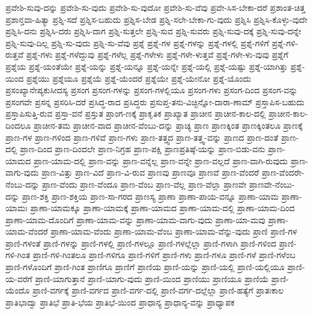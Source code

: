 {ಪ್ರವೇಶಿ-ಸುವು-ದನ್ನು
ಪ್ರವೇಶಿ-ಸು-ವುದು
ಪ್ರವೇಶಿ-ಸು-ವುದೋ
ಪ್ರವೇಶಿ-ಸು-ವೆವು
ಪ್ರವೇ-ಸಿಸ-ಬೇಕಾ-ದರೆ
ಪ್ರಶಾಂತ-ಚಿತ್ತ
ಪ್ರಶಾನ್ತವಾ-ಹಿತ್ಯಾ
ಪ್ರಶ್ನಿ-ಸದೆ
ಪ್ರಶ್ನಿಸ-ಬಹುದು
ಪ್ರಶ್ನಿಸ-ಬೇಡ
ಪ್ರಶ್ನಿ-ಸಲೇ-ಬೇಕಾ-ಗು-ವುದು
ಪ್ರಶ್ನಿಸಿ
ಪ್ರಶ್ನಿಸಿ-ಕೊಳ್ಳು-ವುದೇ
ಪ್ರಶ್ನಿಸಿ-ದನು
ಪ್ರಶ್ನಿಸಿ-ದರು
ಪ್ರಶ್ನಿಸಿ-ದಾಗ
ಪ್ರಶ್ನಿ-ಸುತ್ತಲೇ
ಪ್ರಶ್ನಿ-ಸುವ
ಪ್ರಶ್ನಿ-ಸುವರು
ಪ್ರಶ್ನಿ-ಸುವು-ದಕ್ಕೆ
ಪ್ರಶ್ನಿ-ಸುವು-ದನ್ನೇ
ಪ್ರಶ್ನಿ-ಸುವು-ದಿಲ್ಲ
ಪ್ರಶ್ನಿ-ಸು-ವುದು
ಪ್ರಶ್ನಿ-ಸು-ವೆವು
ಪ್ರಶ್ನೆ
ಪ್ರಶ್ನೆ-ಗಳ
ಪ್ರಶ್ನೆ-ಗಳನ್ನು
ಪ್ರಶ್ನೆ-ಗಳಲ್ಲಿ
ಪ್ರಶ್ನೆ-ಗಳಿಗೆ
ಪ್ರಶ್ನೆ-ಗಳಿ-ರುತ್ತವೆ
ಪ್ರಶ್ನೆ-ಗಳು
ಪ್ರಶ್ನೆ-ಗಳೆದ್ದುವು
ಪ್ರಶ್ನೆ-ಗಳೆಲ್ಲ
ಪ್ರಶ್ನೆ-ಗಳೇಳು
ಪ್ರಶ್ನೆ-ಗಳೇ-ಳುತ್ತವೆ
ಪ್ರಶ್ನೆ-ಗಳೇ-ಳು-ವುವು
ಪ್ರಶ್ನೆಗೆ
ಪ್ರಶ್ನೆಯ
ಪ್ರಶ್ನೆ-ಯಂತೆಯೇ
ಪ್ರಶ್ನೆ-ಯನ್ನು
ಪ್ರಶ್ನೆ-ಯನ್ನೂ
ಪ್ರಶ್ನೆ-ಯನ್ನೇ
ಪ್ರಶ್ನೆ-ಯಲ್ಲಿ
ಪ್ರಶ್ನೆ-ಯಷ್ಟು
ಪ್ರಶ್ನೆ-ಯಾಗಿತ್ತು
ಪ್ರಶ್ನೆ-ಯಿಂದ
ಪ್ರಶ್ನೆಯು
ಪ್ರಶ್ನೆಯೂ
ಪ್ರಶ್ನೆಯೆ
ಪ್ರಶ್ನೆ-ಯೆಂದರೆ
ಪ್ರಶ್ನೆಯೇ
ಪ್ರಶ್ನೆ-ಯೇನೋ
ಪ್ರಶ್ನೆ-ಯೊಂದು
ಪ್ರಸಂಖ್ಯಾನೇಪ್ಯಕುಸೀದಸ್ಯ
ಪ್ರಸಂಗ
ಪ್ರಸಂಗ-ಗಳನ್ನು
ಪ್ರಸಂಗ-ಗಳಲ್ಲಿಯೂ
ಪ್ರಸಂಗ-ಗಳು
ಪ್ರಸಂಗ-ದಿಂದ
ಪ್ರಸಂಗ-ವನ್ನು
ಪ್ರಸಂಗವೇ
ಪ್ರಸನ್ನ
ಪ್ರಸರಿಸಿ-ದರೆ
ಪ್ರಸಿದ್ಧ-ರಾದ
ಪ್ರಸಿದ್ಧರು
ಪ್ರಸುಪ್ತ-ತನು-ವಿಚ್ಛಿನ್ನೋ-ದಾರಾ-ಣಾಮ್
ಪ್ರಸ್ತಾಪಿಸ-ಬಹುದು
ಪ್ರಸ್ತಾಪಿಸುತ್ತಿ-ರುವ
ಪ್ರಸ್ತಾ-ವನೆ
ಪ್ರಸ್ತುತ
ಪ್ರಾಂಗ-ಣಕ್ಕೆ
ಪ್ರಾಕೃತಿಕ
ಪ್ರಾಖ್ಯಾತ
ಪ್ರಾಚೀನ
ಪ್ರಾಚೀನ-ಕಾಲ-ದಲ್ಲಿ
ಪ್ರಾಚೀನ-ಕಾಲ-ದಿಂದಲೂ
ಪ್ರಾಚೀನ-ತಮ
ಪ್ರಾಚೀನ-ವಾದ
ಪ್ರಾಚೀನ-ವೆಂಬು-ದನ್ನು
ಪ್ರಾಚ್ಯ
ಪ್ರಾಣ
ಪ್ರಾಣಕ್ಕಿಂತ
ಪ್ರಾಣಕ್ಕಿಂತಲೂ
ಪ್ರಾಣಕ್ಕೆ
ಪ್ರಾಣ-ಗಳ
ಪ್ರಾಣ-ಗಳಿಂದ
ಪ್ರಾಣ-ಗಳಿವೆ
ಪ್ರಾಣ-ಗಳು
ಪ್ರಾಣ-ತತ್ತ್ವದ
ಪ್ರಾಣ-ತತ್ತ್ವ-ವನ್ನು
ಪ್ರಾಣದ
ಪ್ರಾಣ-ದಂತೆ
ಪ್ರಾಣ-ದಲ್ಲಿ
ಪ್ರಾಣ-ದಿಂದ
ಪ್ರಾಣ-ದಿಂದಲೇ
ಪ್ರಾಣ-ನಿಗ್ರಹ
ಪ್ರಾಣ-ಪಕ್ಷಿ
ಪ್ರಾಣಪ್ರತಿಷ್ಠೆ-ಯನ್ನು
ಪ್ರಾಣ-ಬಿಡು-ವನು
ಪ್ರಾಣ-ಯಾಮದ
ಪ್ರಾಣ-ಯಾಮ-ದಲ್ಲಿ
ಪ್ರಾಣ-ವನ್ನು
ಪ್ರಾಣ-ವನ್ನೆಲ್ಲ
ಪ್ರಾಣ-ವನ್ನೇ
ಪ್ರಾಣ-ವಲ್ಲದೆ
ಪ್ರಾಣ-ವಾಗಿ-ರುವುದು
ಪ್ರಾಣ-ವಾಗು-ವುದು
ಪ್ರಾಣ-ವಿತ್ತು
ಪ್ರಾಣ-ವಿದೆ
ಪ್ರಾಣ-ವಿ-ರುವ
ಪ್ರಾಣವು
ಪ್ರಾಣವೂ
ಪ್ರಾಣವೆ
ಪ್ರಾಣ-ವೆಂದರೆ
ಪ್ರಾಣ-ವೆಂದರೇ-ನೆಂಬು-ದನ್ನು
ಪ್ರಾಣ-ವೆಂದು
ಪ್ರಾಣ-ವೆಂದೂ
ಪ್ರಾಣ-ವೆಂಬ
ಪ್ರಾಣ-ವೆಲ್ಲ
ಪ್ರಾಣ-ವೆಲ್ಲಾ
ಪ್ರಾಣವೇ
ಪ್ರಾಣವೇ-ನೆಂಬು-ದನ್ನು
ಪ್ರಾಣ-ಶಕ್ತಿ
ಪ್ರಾಣ-ಶಕ್ತಿಯ
ಪ್ರಾಣ-ಸಾ-ಗರದ
ಪ್ರಾಣಸ್ಯ
ಪ್ರಾಣಾ
ಪ್ರಾಣಾ-ಪಾಯ-ವನ್ನೂ
ಪ್ರಾಣಾ-ಯಾಮ
ಪ್ರಾಣಾ-ಯಾಮಃ
ಪ್ರಾಣಾ-ಯಾಮಕ್ಕೂ
ಪ್ರಾಣಾ-ಯಾಮಕ್ಕೆ
ಪ್ರಾಣಾ-ಯಾಮದ
ಪ್ರಾಣಾ-ಯಾಮ-ದಲ್ಲಿ
ಪ್ರಾಣಾ-ಯಾಮ-ದಿಂದ
ಪ್ರಾಣಾ-ಯಾಮ-ದೊಂದಿಗೆ
ಪ್ರಾಣಾ-ಯಾಮ-ವನ್ನು
ಪ್ರಾಣಾ-ಯಾಮ-ವಾಗು-ವುದು
ಪ್ರಾಣಾ-ಯಾ-ಮವು
ಪ್ರಾಣಾ-ಯಾಮ-ವೆಂದರೆ
ಪ್ರಾಣಾ-ಯಾಮ-ವೆಂದು
ಪ್ರಾಣಾ-ಯಾಮ-ವೆಂಬ
ಪ್ರಾಣಾ-ಯಾಮ-ವೆನ್ನು-ವುದು
ಪ್ರಾಣಿ
ಪ್ರಾಣಿ-ಗಳ
ಪ್ರಾಣಿ-ಗಳಂತೆ
ಪ್ರಾಣಿ-ಗಳನ್ನು
ಪ್ರಾಣಿ-ಗಳಲ್ಲಿ
ಪ್ರಾಣಿ-ಗಳಲ್ಲೂ
ಪ್ರಾಣಿ-ಗಳಲ್ಲೆಲ್ಲಾ
ಪ್ರಾಣಿ-ಗಳಾಗಿ
ಪ್ರಾಣಿ-ಗಳಿಂದ
ಪ್ರಾಣಿ-ಗಳಿ-ಗಿಂತ
ಪ್ರಾಣಿ-ಗಳಿ-ಗಿಂತಲೂ
ಪ್ರಾಣಿ-ಗಳಿಗೂ
ಪ್ರಾಣಿ-ಗಳಿಗೆ
ಪ್ರಾಣಿ-ಗಳು
ಪ್ರಾಣಿ-ಗಳೂ
ಪ್ರಾಣಿ-ಗಳೆ
ಪ್ರಾಣಿ-ಗಳೆಂಬ
ಪ್ರಾಣಿ-ಗಳೊಂದಿಗೆ
ಪ್ರಾಣಿ-ಗಿಂತ
ಪ್ರಾಣಿಗೂ
ಪ್ರಾಣಿಗೆ
ಪ್ರಾಣಿಯ
ಪ್ರಾಣಿ-ಯನ್ನು
ಪ್ರಾಣಿ-ಯಲ್ಲಿ
ಪ್ರಾಣಿ-ಯಲ್ಲಿಯೂ
ಪ್ರಾಣಿ-ಯ-ವರೆಗೆ
ಪ್ರಾಣಿ-ಯಾಗುತ್ತಾನೆ
ಪ್ರಾಣಿ-ಯಾಗು-ವುದು
ಪ್ರಾಣಿ-ಯಿಂದ
ಪ್ರಾಣಿಯು
ಪ್ರಾಣಿಯೂ
ಪ್ರಾಣಿಯೆ
ಪ್ರಾಣಿ-ಯೆಂದೊ
ಪ್ರಾಣಿ-ವರ್ಗಕ್ಕೆ
ಪ್ರಾಣಿ-ವರ್ಗದ
ಪ್ರಾಣಿ-ವರ್ಗ-ದಲ್ಲಿ
ಪ್ರಾಣಿ-ವರ್ಗ-ದಲ್ಲೆಲ್ಲಾ
ಪ್ರಾಣಿ-ಹತ್ಯೆಗೆ
ಪ್ರಾತಃಕಾಲ
ಪ್ರಾತಿಭಾದ್ವಾ
ಪ್ರಾತಿಭೆ
ಪ್ರಾತಿ-ಭೆಯ
ಪ್ರಾತಿಭೆ-ಯಿಂದ
ಪ್ರಾಧಾನ್ಯ
ಪ್ರಾಧಾನ್ಯ-ವನ್ನು
ಪ್ರಾಧ್ಯಾಪಕ
}
